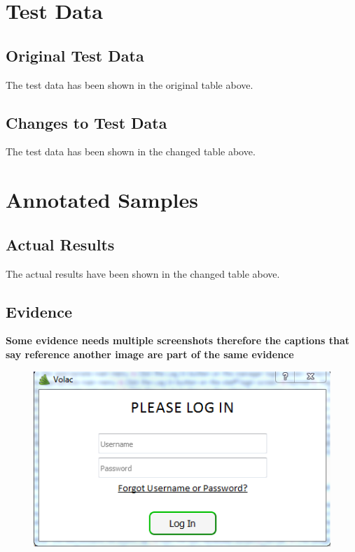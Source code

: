 \begin{landscape}
\begin{center}
\begin{longtable}{|p{1.5cm}|p{2cm}|p{2.5cm}|p{2cm}|p{2cm}|p{2cm}|p{3cm}|p{1.7cm}|}
    \label{table:tests}
    \end{longtable}
\end{center}

\section{Test Data}

\subsection{Original Test Data}

The test data has been shown in the original table above.

\subsection{Changes to Test Data}

The test data has been shown in the changed table above.

\section{Annotated Samples}

\subsection{Actual Results}

The actual results have been shown in the changed table above.

\end{landscape}

\subsection{Evidence}

\textbf{Some evidence needs multiple screenshots therefore the captions that say reference another image are part of the same evidence}
\

\begin{figure}[H]
    \includegraphics[width=\textwidth]{./Testing/Images/LoginScreen.png}
    \label{fig:LoginScreen}
\end{figure}

